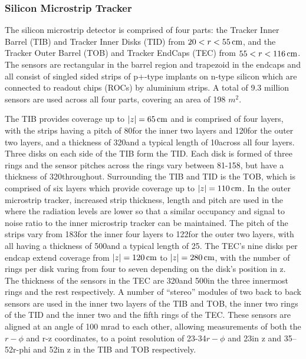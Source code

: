 \subsubsection{Silicon Microstrip Tracker}
The silicon microstrip detector is comprised of four parts: the Tracker Inner Barrel (TIB) and Tracker Inner Disks (TID) from $20 < r < 55\,\text{cm}$, and the Tracker Outer Barrel (TOB) and Tracker EndCaps (TEC) from $55 < r < 116\,\text{cm}$.
The sensors are rectangular in the barrel region and trapezoid in the endcaps and all consist of singled sided strips of p+-type implants on n-type silicon which are connected to readout chips (ROCs) by aluminium strips.
A total of 9.3 million sensors are used across all four parts, covering an area of 198 $\unit{m}^{2}$.

The TIB provides coverage up to $|z| = 65\,\text{cm}$ and is comprised of four layers, with the strips having a pitch of 80\mum for the inner two layers and 120\mum for the outer two layers, and a thickness of 320\mum and a typical length of 10\cm across all four layers.
Three disks on each side of the TIB form the TID. 
Each disk is formed of three rings and the sensor pitches across the rings vary between 81-158\mum, but have a thickness of 320\mum throughout.
Surrounding the TIB and TID is the TOB,	which is comprised of six layers which provide coverage up to $|z| = 110\,\text{cm}$.
In the outer microstrip tracker, increased strip thickness, length and pitch are used in the where the radiation levels are lower so that a similar occupancy and signal to noise ratio to the inner microstrip tracker can be maintained.
The pitch of the strips vary from 183\mum for the inner four layers to 122\mum for the outer two layers, with all having a thickness of 500\mum and a typical length of 25\cm. 
The TEC's nine disks per endcap extend coverage from $|z| = 120\,\text{cm}$ to $|z| = 280\,\text{cm}$, with the number of rings per disk varing from four to seven depending on the disk's position in z.
The thickness of the sensors in the TEC are 320\mum and 500\mum in the three innermost rings and the rest respectively.
A number of ``stereo'' modules of two back to back sensors are used in the inner two layers of the TIB and TOB, the inner two rings of the TID and the inner two and the fifth rings of the TEC.
These sensors are aligned at an angle of 100 mrad to each other, allowing measurements of both the $r-\phi$ and r-z coordinates, to a point resolution of 23-34\mum $r-\phi$ and 23\mum in z and 35–52\mum r-phi and 52\mum in z in the TIB and TOB respectively.

